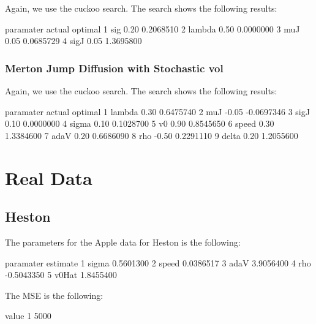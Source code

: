\documentclass{article}
\begin{document}
Again, we use the cuckoo search. The search shows the following results:

\begin{Schunk}
\begin{Soutput}
  paramater actual   optimal
1       sig   0.20 0.2068510
2    lambda   0.50 0.0000000
3       muJ   0.05 0.0685729
4      sigJ   0.05 1.3695800
\end{Soutput}
\end{Schunk}

\subsubsection{Merton Jump Diffusion with Stochastic vol}

Again, we use the cuckoo search. The search shows the following results:

\begin{Schunk}
\begin{Soutput}
  paramater actual    optimal
1    lambda   0.30  0.6475740
2       muJ  -0.05 -0.0697346
3      sigJ   0.10  0.0000000
4     sigma   0.10  0.1028700
5        v0   0.90  0.8545650
6     speed   0.30  1.3384600
7      adaV   0.20  0.6686090
8       rho  -0.50  0.2291110
9     delta   0.20  1.2055600
\end{Soutput}
\end{Schunk}

\section{Real Data}

\subsection{Heston}

The parameters for the Apple data for Heston is the following:

\begin{Schunk}
\begin{Soutput}
  paramater   estimate
1     sigma  0.5601300
2     speed  0.0386517
3      adaV  3.9056400
4       rho -0.5043350
5     v0Hat  1.8455400
\end{Soutput}
\end{Schunk}

The MSE is the following:

\begin{Schunk}
\begin{Soutput}
  value
1  5000
\end{Soutput}
\end{Schunk}
\end{document}
